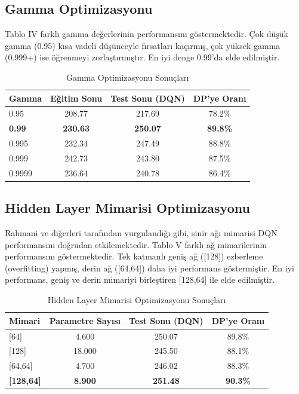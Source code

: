 \documentclass[onecolumn]{IEEEtran}
\begin{document}
\subsection{Gamma Optimizasyonu}

Tablo IV farklı gamma değerlerinin performansını göstermektedir. Çok düşük gamma (0.95) kısa vadeli düşünceyle fırsatları kaçırmış, çok yüksek gamma (0.999+) ise öğrenmeyi zorlaştırmıştır. En iyi denge 0.99'da elde edilmiştir.

\begin{table}[H]
\centering
\caption{Gamma Optimizasyonu Sonuçları}
\begin{tabular}{lccc}
\toprule
\textbf{Gamma} & \textbf{Eğitim Sonu} & \textbf{Test Sonu (DQN)} & \textbf{DP'ye Oranı} \\
\midrule
0.95 & 208.77 & 217.69 & 78.2\% \\
\textbf{0.99} & \textbf{230.63} & \textbf{250.07} & \textbf{89.8\%} \\
0.995 & 232.34 & 247.49 & 88.8\% \\
0.999 & 242.73 & 243.80 & 87.5\% \\
0.9999 & 236.64 & 240.78 & 86.4\% \\
\bottomrule
\end{tabular}
\label{tab:gamma}
\end{table}

\subsection{Hidden Layer Mimarisi Optimizasyonu}

Rahmani ve diğerleri \cite{rahmani2025integrated} tarafından vurgulandığı gibi, sinir ağı mimarisi DQN performansını doğrudan etkilemektedir. Tablo V farklı ağ mimarilerinin performansını göstermektedir. Tek katmanlı geniş ağ ([128]) ezberleme (overfitting) yapmış, derin ağ ([64,64]) daha iyi performans göstermiştir. En iyi performans, geniş ve derin mimariyi birleştiren [128,64] ile elde edilmiştir.

\begin{table}[h]
\centering
\caption{Hidden Layer Mimarisi Optimizasyonu Sonuçları}
\begin{tabular}{lccc}
\toprule
\textbf{Mimari} & \textbf{Parametre Sayısı} & \textbf{Test Sonu (DQN)} & \textbf{DP'ye Oranı} \\
\midrule
{[64]} & 4.600 & 250.07 & 89.8\% \\
{[128]} & 18.000 & 245.50 & 88.1\% \\
{[64,64]} & 4.700 & 246.02 & 88.3\% \\
\textbf{[128,64]} & \textbf{8.900} & \textbf{251.48} & \textbf{90.3\%} \\
\bottomrule
\end{tabular}
\label{tab:architecture}
\end{table}
\end{document}
